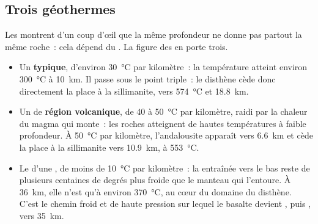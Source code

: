 \subsection{Trois géothermes}

Les  montrent d'un coup d'œil que la même profondeur ne donne pas
partout la même roche~: cela dépend du . La figure des 
en porte trois.

\begin{itemize}
  \item Un  \textbf{typique}, d'environ \qty{30}{\celsius} par
        kilomètre~: la température atteint environ \qty{300}{\celsius} à
        \qty{10}{km}. Il passe sous le point triple~: le disthène cède donc
        directement la place à la sillimanite, vers \qty{574}{\celsius} et
        \qty{18.8}{km}.
  \item Un  de \textbf{région volcanique}, de 40 à
        \qty{50}{\celsius} par kilomètre, raidi par la chaleur du magma qui
        monte~: les roches atteignent de hautes températures à faible
        profondeur. À \qty{50}{\celsius} par kilomètre, l'andalousite
        apparaît vers \qty{6.6}{km} et cède la place à la sillimanite vers
        \qty{10.9}{km}, à \qty{553}{\celsius}.
  \item Le  d'une \textbf{}, de moins de
        \qty{10}{\celsius} par kilomètre~: la  entraînée vers
        le bas reste de plusieurs centaines de degrés plus froide que le
        manteau qui l'entoure. À \qty{36}{km}, elle n'est qu'à environ
        \qty{370}{\celsius}, au cœur du domaine du disthène. C'est le chemin
        froid et de haute pression sur lequel le basalte devient , puis , vers \qty{35}{km}.
\end{itemize}

